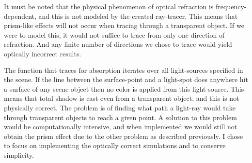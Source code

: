 \documentclass{article}
\begin{document}
It must be noted that the physical phenomenon of
optical refraction is frequency-dependent,
and this is not modeled by the created ray-tracer.
This means that prism-like effects will not occur when
tracing through a transparent object.  If we were to model
this, it would not suffice to trace from only one direction
of refraction.  And any finite number of directions we chose
to trace would yield optically incorrect results.

The function that traces for absorption iterates over all
light-sources specified in the scene.  If the line between
the surface-point and a light-spot does anywhere hit a
surface of any scene object
then no color is applied from this light-source.
This means that total shadow is cast even from
a transparent object, and this is not physically correct.
The problem is of finding what path a light-ray would take
through transparent objects to reach a given point.
A solution to this problem would be computationally intensive,
and when implemented we would still not obtain the
prism effect due to the other problem as described previously.
I chose to focus on implementing the optically
correct simulations and to conserve simplicity.



\end{document}
